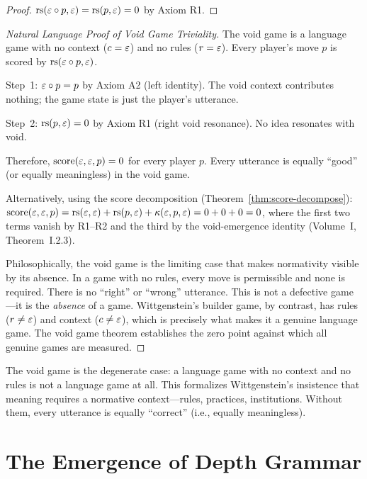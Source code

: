 \begin{proof}
$\mathrm{rs}(\varepsilon \circ p, \varepsilon) = \mathrm{rs}(p, \varepsilon) = 0$ by Axiom R1.
\end{proof}

\begin{proof}[Natural Language Proof of Void Game Triviality]
The void game is a language game with no context ($c = \varepsilon$) and no rules
($r = \varepsilon$). Every player's move $p$ is scored by $\mathrm{rs}(\varepsilon \circ p, \varepsilon)$.

Step~1: $\varepsilon \circ p = p$ by Axiom A2 (left identity). The void context
contributes nothing; the game state is just the player's utterance.

Step~2: $\mathrm{rs}(p, \varepsilon) = 0$ by Axiom R1 (right void resonance). No idea
resonates with void.

Therefore, $\mathrm{score}(\varepsilon, \varepsilon, p) = 0$ for every player $p$. Every
utterance is equally ``good'' (or equally meaningless) in the void game.

Alternatively, using the score decomposition (Theorem~\ref{thm:score-decompose}):
$\mathrm{score}(\varepsilon, \varepsilon, p) = \mathrm{rs}(\varepsilon, \varepsilon) + \mathrm{rs}(p, \varepsilon)
+ \kappa(\varepsilon, p, \varepsilon) = 0 + 0 + 0 = 0$, where the first two terms vanish
by R1--R2 and the third by the void-emergence identity (Volume~I, Theorem~I.2.3).

Philosophically, the void game is the limiting case that makes normativity
visible by its absence. In a game with no rules, every move is permissible
and none is required. There is no ``right'' or ``wrong'' utterance. This is
not a defective game---it is the \emph{absence} of a game. Wittgenstein's
builder game, by contrast, has rules ($r \neq \varepsilon$) and context ($c \neq \varepsilon$),
which is precisely what makes it a genuine language game. The void game theorem
establishes the zero point against which all genuine games are measured.
\end{proof}

\begin{interpretation}
The void game is the degenerate case: a language game with no context and no
rules is not a language game at all. This formalizes Wittgenstein's insistence
that meaning requires a normative context---rules, practices, institutions.
Without them, every utterance is equally ``correct'' (i.e., equally
meaningless).
\end{interpretation}

\section{The Emergence of Depth Grammar}

